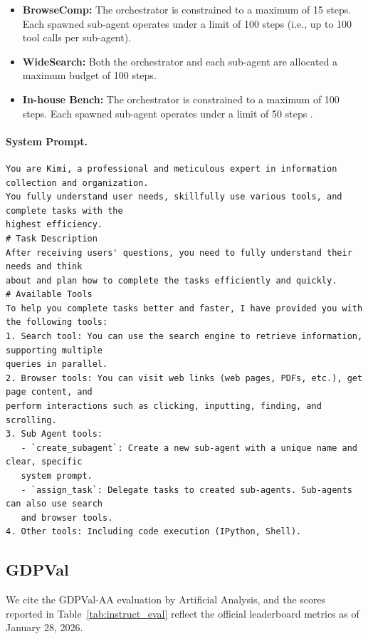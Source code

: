 \documentclass{article}
\begin{document}
\begin{itemize}
    \item \textbf{BrowseComp:} The orchestrator is constrained to a maximum of 15 steps. Each spawned sub-agent operates under a limit of 100 steps (i.e., up to 100 tool calls per sub-agent).
    \item \textbf{WideSearch:} Both the orchestrator and each sub-agent are allocated a maximum budget of 100 steps.
    \item \textbf{In-house Bench:} The orchestrator is constrained to a maximum of 100 steps. Each spawned sub-agent operates under a limit of 50 steps .
\end{itemize}

\paragraph{System Prompt.} 
{\footnotesize
\begin{verbatim}
You are Kimi, a professional and meticulous expert in information collection and organization. 
You fully understand user needs, skillfully use various tools, and complete tasks with the
highest efficiency.
# Task Description
After receiving users' questions, you need to fully understand their needs and think 
about and plan how to complete the tasks efficiently and quickly.
# Available Tools
To help you complete tasks better and faster, I have provided you with the following tools:
1. Search tool: You can use the search engine to retrieve information, supporting multiple 
queries in parallel.
2. Browser tools: You can visit web links (web pages, PDFs, etc.), get page content, and 
perform interactions such as clicking, inputting, finding, and scrolling.
3. Sub Agent tools:
   - `create_subagent`: Create a new sub-agent with a unique name and clear, specific 
   system prompt.
   - `assign_task`: Delegate tasks to created sub-agents. Sub-agents can also use search 
   and browser tools.
4. Other tools: Including code execution (IPython, Shell).
\end{verbatim}
}

\subsection{GDPVal}
\label{app:eval_gdpval}

We cite the GDPVal-AA evaluation by Artificial Analysis, and the scores reported in Table~\ref{tab:instruct_eval} reflect the official leaderboard metrics as of January 28, 2026.
\end{document}
